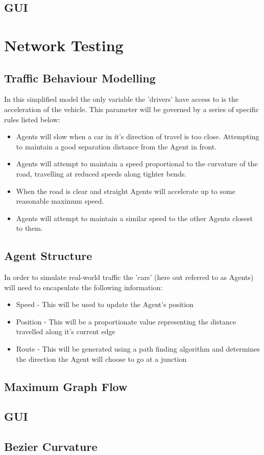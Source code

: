     \subsection{GUI}

\section{Network Testing}

    \subsection{Traffic Behaviour Modelling}

    In this simplified model the only variable the 'drivers' have access to is the acceleration of the vehicle. This parameter will be governed by a series of specific rules listed below:

    \begin{itemize}
        \item Agents will slow when a car in it's direction of travel is too close. Attempting to maintain a good separation distance from the Agent in front.

        \item Agents will attempt to maintain a speed proportional to the curvature of the road, travelling at reduced speeds along tighter bends.

        \item When the road is clear and straight Agents will accelerate up to some reasonable maximum speed.

        \item Agents will attempt to maintain a similar speed to the other Agents closest to them.
    \end{itemize}

    \subsection{Agent Structure}

    In order to simulate real-world traffic the 'cars' (here out referred to as Agents) will need to encapsulate the following information:

    \begin{itemize}
        \item Speed - This will be used to update the Agent's position
        \item Position - This will be a proportionate value representing the distance travelled along it's current edge
        \item Route - This will be generated using a path finding algorithm and determines the direction the Agent will choose to go at a junction
    \end{itemize}

    \subsection{Maximum Graph Flow}

    \subsection{GUI}

    \subsection{Bezier Curvature}
